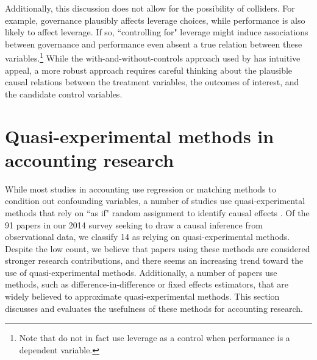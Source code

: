 \documentclass[12pt,reqno,titlepage]{amsart}
\theoremstyle{definition}
\begin{document}
\begin{doublespace}
Additionally, this discussion does not allow for the possibility of colliders.
For example, governance plausibly affects leverage choices, while performance is also likely to affect leverage.
If so, ``controlling for" leverage might induce associations between governance and performance even absent a true relation between these variables.\footnote{
Note that \citet{Larcker:2007aa} do not in fact use leverage as a control when performance is a dependent variable.}
While the with-and-without-controls approach used by \citet{Larcker:2007aa} has intuitive appeal, a more robust approach requires careful thinking about the plausible causal relations between the treatment variables, the outcomes of interest, and the candidate control variables.

\section{Quasi-experimental methods in accounting research} \label{sec:quasi}
While most studies in accounting use regression or matching methods to condition out confounding variables, a number of studies use quasi-experimental methods that rely on ``as if" random assignment to identify causal effects \citep{Dunning:2012tt}.
Of the 91 papers in our 2014 survey seeking to draw a causal inference from observational data, we classify 14 as relying on quasi-experimental methods.
Despite the low count, we believe that papers using these methods are considered stronger research contributions, and there seems an increasing trend toward the use of quasi-experimental methods.
Additionally, a number of papers use methods, such as difference-in-difference or fixed effects estimators, that are widely believed to approximate quasi-experimental methods.
This section discusses and evaluates the usefulness of these methods for accounting research. 


\end{doublespace}
\end{document}

